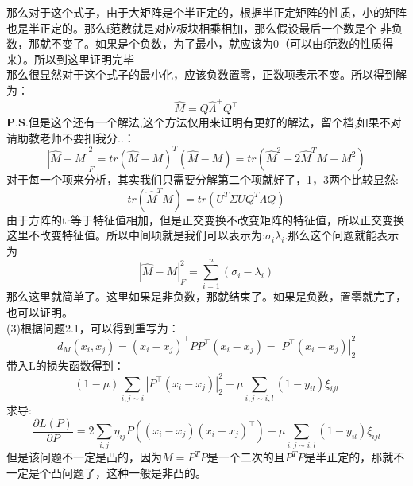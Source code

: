 \documentclass[answers]{exam}  %
\begin{document}
\begin{questions}
\begin{solution}
\begin{parts}
    那么对于这个式子，由于大矩阵是个半正定的，根据半正定矩阵的性质，小的矩阵也是半正定的。那么f范数就是对应板块相乘相加，那么假设最后一个数是个
    非负数，那就不变了。如果是个负数，为了最小，就应该为0（可以由f范数的性质得来）。所以到这里证明完毕\\
    那么很显然对于这个式子的最小化，应该负数置零，正数项表示不变。所以得到解为：\\
    \[
        \hat{M} = Q \hat{\Lambda}^+ Q^\top
    \]  
    $\boldsymbol{P.S}$.但是这个还有一个解法,这个方法仅用来证明有更好的解法，留个档,如果不对请助教老师不要扣我分..：\\
    \[
        |\hat{M} - M|_F^2  = tr(\hat{M} - M)^T(\hat{M} - M) = tr(\hat{M}^2 - 2\hat{M}^T M + M^2)
    \]
    对于每一个项来分析，其实我们只需要分解第二个项就好了，1，3两个比较显然:
    \[
        tr(\hat{M}^T M) = tr(U^T \Sigma U Q^T \Lambda Q)
    \]
    由于方阵的tr等于特征值相加，但是正交变换不改变矩阵的特征值，所以正交变换这里不改变特征值。所以中间项就是我们可以表示为:$\sigma_i \lambda_i$.那么这个问题就能表示为\\
    \[
        |\hat{M} - M|_F^2 = \sum_{i=1}^{n} (\sigma_i - \lambda_i)
    \]
    那么这里就简单了。这里如果是非负数，那就结束了。如果是负数，置零就完了，也可以证明。\\
    (3)根据问题2.1，可以得到重写为：
    \[
        d_M(x_i, x_j) = (x_i - x_j)^\top P P^\top (x_i - x_j) = |P^\top (x_i - x_j)|_2^2
    \]
    带入L的损失函数得到：
    \[
        (1-\mu)\sum_{i,j\sim i} |P^\top (x_i - x_j)|_2^2 +\mu\sum_{i,j\sim i,l}(1-y_{il})\xi_{ijl}
    \]
    求导:
    \[
        \frac{\partial L(P)}{\partial P} = 2 \sum_{i,j} \eta_{ij} P ((x_i - x_j)(x_i - x_j)^\top) + \mu\sum_{i,j\sim i,l}(1-y_{il})\xi_{ijl}
    \]
    但是该问题不一定是凸的，因为$M  = P^T P$是一个二次的且$P^TP$是半正定的，那就不一定是个凸问题了，这种一般是非凸的。
\end{parts}
\end{solution}

\end{questions}
\end{document}
